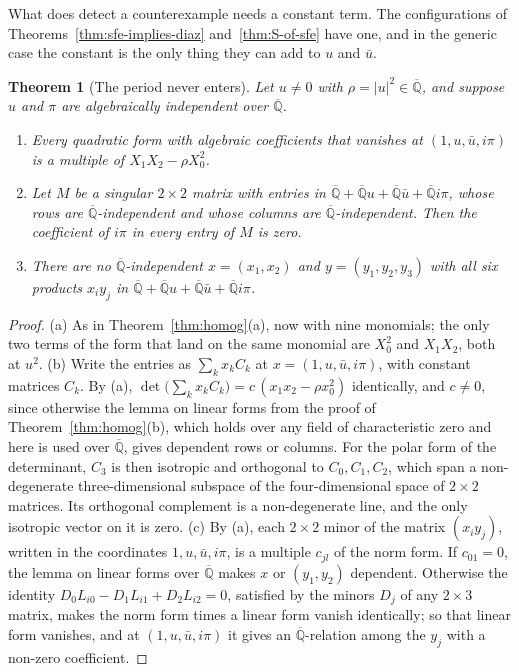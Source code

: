 \documentclass[11pt,a4paper]{article}
\theoremstyle{plain}
\newtheorem{theorem}{Theorem}[section]
\theoremstyle{definition}
\newcommand{\Alg}{\overline{\mathbb{Q}}}
\begin{document}
What does detect a counterexample needs a constant term. The configurations of
Theorems~\ref{thm:sfe-implies-diaz} and~\ref{thm:S-of-sfe} have one, and in the generic case the
constant is the only thing they can add to $u$ and $\bar u$.

\begin{theorem}[The period never enters]\label{thm:period}
Let $u\neq0$ with $\rho=|u|^{2}\in\Alg$, and suppose $u$ and $\pi$ are algebraically independent
over $\Alg$.
\begin{enumerate}[label=\textup{(\alph*)}]
  \item Every quadratic form with algebraic coefficients that vanishes at $(1,u,\bar u,i\pi)$ is a
        multiple of $X_{1}X_{2}-\rho X_{0}^{2}$.
  \item Let $M$ be a singular $2\times2$ matrix with entries in
        $\Alg+\Alg u+\Alg\bar u+\Alg i\pi$, whose rows are $\Alg$-independent and whose columns are
        $\Alg$-independent. Then the coefficient of $i\pi$ in every entry of $M$ is zero.
  \item There are no $\Alg$-independent $x=(x_{1},x_{2})$ and $y=(y_{1},y_{2},y_{3})$ with all six
        products $x_{i}y_{j}$ in $\Alg+\Alg u+\Alg\bar u+\Alg i\pi$.
\end{enumerate}
\end{theorem}

\begin{proof}
(a) As in Theorem~\ref{thm:homog}(a), now with nine monomials; the only two terms of the form
that land on the same monomial are $X_{0}^{2}$ and $X_{1}X_{2}$, both at $u^{2}$.
(b) Write the entries as $\sum_{k}x_{k}C_{k}$ at $x=(1,u,\bar u,i\pi)$, with constant matrices
$C_{k}$. By (a), $\det\bigl(\sum_{k}x_{k}C_{k}\bigr)=c\,(x_{1}x_{2}-\rho x_{0}^{2})$ identically,
and $c\neq0$, since otherwise the lemma on linear forms from the proof of
Theorem~\ref{thm:homog}(b), which holds over any field of characteristic zero and here is used
over $\Alg$, gives dependent rows or columns.
For the polar form of the determinant, $C_{3}$ is then isotropic and orthogonal to
$C_{0},C_{1},C_{2}$, which span a non-degenerate three-dimensional subspace of the
four-dimensional space of $2\times2$ matrices. Its orthogonal complement is a non-degenerate line,
and the only isotropic vector on it is zero.
(c) By (a), each $2\times2$ minor of the matrix $(x_{i}y_{j})$, written in the coordinates
$1,u,\bar u,i\pi$, is a multiple $c_{jl}$ of the norm form. If $c_{01}=0$, the lemma on linear
forms over $\Alg$ makes $x$ or $(y_{1},y_{2})$ dependent. Otherwise the identity
$D_{0}L_{i0}-D_{1}L_{i1}+D_{2}L_{i2}=0$, satisfied by the minors $D_{j}$ of any $2\times3$ matrix,
makes the norm form times a linear form vanish identically; so that linear form vanishes, and at
$(1,u,\bar u,i\pi)$ it gives an $\Alg$-relation among the $y_{j}$ with a non-zero coefficient.
\end{proof}
\end{document}

